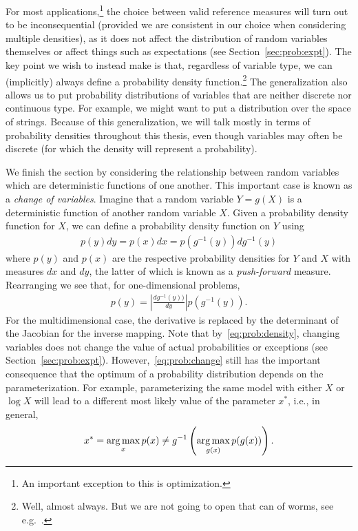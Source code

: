 For most applications,\footnote{An important
	exception to this is optimization.}
the choice between valid reference measures will turn out to be
inconsequential (provided we are consistent in our choice when considering multiple
densities), as it does not affect the distribution of random variables themselves 
or affect things such as expectations (see Section~\ref{sec:prob:expt}).  
The key point we wish to instead make is that, regardless of variable type, we can
(implicitly) always define a probability density function.\footnote{Well, almost always.  But we
	are not going to open that can of worms, see e.g.~\cite{durrett2010probability}.}  
The generalization also allows us
to put probability distributions of variables that are neither discrete nor continuous type.
For example, we might want to put a distribution over the space of strings.  
Because of this generalization, we will talk mostly in terms of probability densities throughout
this thesis, even though variables may often be discrete (for which the density will 
represent a probability).

We finish the section by considering the relationship between random variables which
are deterministic functions of one another.  This important case is known as a
\emph{change of variables}.  Imagine
that a random variable $Y=g(X)$ is a deterministic function of another random variable $X$.
Given a probability density function for $X$, we can define a probability density function
on $Y$ using
\begin{align}
\label{eq:prob:change}
p(y)dy = p(x)dx = p(g^{-1}(y))dg^{-1}(y)
\end{align} 
where $p(y)$ and $p(x)$ are the respective probability densities for $Y$ and $X$
with measures $dx$ and $dy$,  the latter of which is known as a \emph{push-forward} measure.
Rearranging we see that, for one-dimensional problems, 
\begin{align}
\label{eq:prob:change2}
p(y) = \left|\frac{dg^{-1}(y))}{dy}\right|p(g^{-1}(y)).
\end{align}
For the multidimensional case, the derivative is replaced by the determinant of the
Jacobian for the inverse mapping.  Note that by~\eqref{eq:prob:density}, changing
variables does not change the value of actual probabilities or exceptions (see
 Section~\ref{sec:prob:expt}).  However,~\eqref{eq:prob:change}
still has the important consequence that the optimum of a probability distribution
depends on the parameterization.  For example, parameterizing the same model with
either $X$ or $\log X$ will lead to a different most likely value of the parameter
$x^*$, i.e., in general,
\begin{align}
x^* = \operatorname*{arg\,max}_{x} p(x) \neq g^{-1} \left(\operatorname*{arg\,max}_{g(x)} p(g(x))\right).
\end{align}

